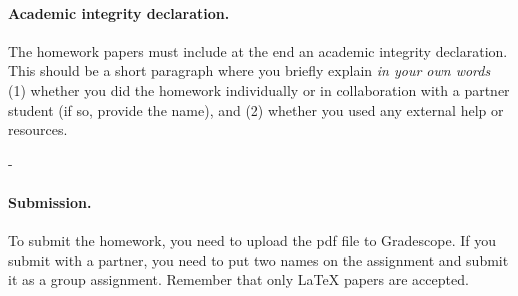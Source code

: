 \documentclass{article}
\begin{document}
\paragraph{Academic integrity declaration.}
The homework papers must include at the end an academic integrity declaration. This should be a short paragraph where you briefly explain 
\emph{in your own words}  (1) whether you did the homework individually or in collaboration with a partner student (if so, provide the name), 
and (2) whether you used any external help or resources. 

\vspace{0.1in} - 


\vskip 0.1in
\paragraph{Submission.}
To submit the homework, you need to upload the pdf file to Gradescope. If you submit with a partner, you need
to put two names on the assignment and submit it as a group assignment.
Remember that only {\LaTeX} papers are accepted. 
\end{document}
